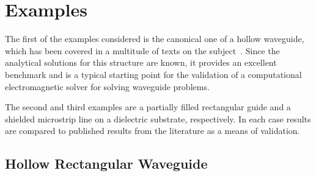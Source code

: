 \section{Examples}
\label{lezar:sec:Examples}

The first of the examples considered is the canonical one of a hollow
waveguide, which has been covered in a multitude of texts on the
subject~\cite{Dav2005, Jin2002, PelCoc1998, Poz2005}.  Since the
analytical solutions for this structure are known, it provides an
excellent benchmark and is a typical starting point for the validation
of a computational electromagnetic solver for solving waveguide
problems.

The second and third examples are a partially filled rectangular guide
and a shielded microstrip line on a dielectric substrate,
respectively. In each case results are compared to published results
from the literature as a means of validation.

\subsection{Hollow Rectangular Waveguide}

